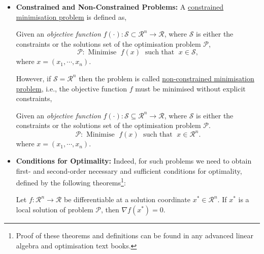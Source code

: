 \begin{itemize}
\item {\bf Constrained and Non-Constrained Problems:} A \underline{constrained minimisation problem} is defined as,
\begin{shaded}
   Given an {\it objective function} $f\left(\cdot\right):\mathcal{S}\subset\mathcal{R}^{n}\rightarrow\mathcal{R}$, where $\mathcal{S}$ is either the constraints or the solutions set of the optimisation problem $\mathcal{P}$,
\begin{displaymath}
   \mathcal{P}: \text{ Minimise }\; f(x)\; \text{ such that }\; x\in\mathcal{S}, 
\end{displaymath}
where $x=\left(x_{1},\cdots,x_{n}\right)$.
\end{shaded}

However, if $\mathcal{S}=\mathcal{R}^{n}$ then the problem is called  \underline{non-constrained minimisation problem}, i.e., the objective function $f$ must be minimised without explicit constraints,
\begin{shaded}
   Given an {\it objective function} $f\left(\cdot\right):\mathcal{S}\subseteq\mathcal{R}^{n}\rightarrow\mathcal{R}$, where $\mathcal{S}$ is either the constraints or the solutions set of the optimisation problem $\mathcal{P}$.
\begin{displaymath}
    \mathcal{P}: \text{ Minimise }\; f(x)\; \text{ such that }\; x\in\mathcal{R}^{n}. 
\end{displaymath}
where $x=\left(x_{1},\cdots,x_{n}\right)$.
\end{shaded}

\item {\bf Conditions for Optimality:} Indeed, for such problems we need to obtain first- and second-order necessary and sufficient conditions for optimality, defined by the following theorems\footnote{Proof of these theorems and definitions can be found in any advanced linear algebra and optimisation text books.}:

\begin{thm}\label{Chapter:GlobalOpt:TheoremFirstOrder}
Let $f:\mathcal{R}^{n}\rightarrow\mathcal{R}$ be differentiable at a solution coordinate $x^{\ast}\in\mathcal{R}^{n}$. If $x^{\ast}$ is a local solution of problem $\mathcal{P}$, then $\nabla f\left(x^{\ast}\right)=0$.
\end{thm}


\end{itemize}
